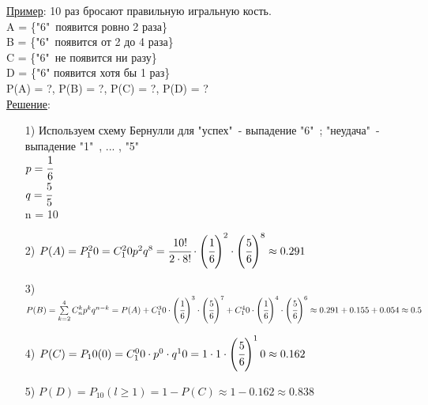 \underline{Пример}: 10 раз бросают правильную игральную кость. \\
A = \{"6"\ появится ровно 2 раза\} \\
B = \{"6"\ появится от 2 до 4 раза\} \\
C = \{"6"\ не появится ни разу\} \\
D = \{"6" появится хотя бы 1 раз\} \\
P(A) = ?, P(B) = ?, P(C) = ?, P(D) = ? \\
\underline{Решение}: \\
\begin{enumerate}
\item[1)] Используем схему Бернулли для "успех"\ - выпадение "6"\ ; "неудача"\ - выпадение "1"\ , ... , "5"\ \\
$p = \cfrac{1}{6}$ \\
$q = \cfrac{5}{5}$ \\
n = 10 \\

\item[2)] $P(A) = P^2_10 = C^2_10 p^2 q^8 = \cfrac{10!}{2 \cdot 8!} \cdot \left(\cfrac{1}{6}\right)^2 \cdot\left(\cfrac{5}{6}\right)^8 \approx 0.291$ \\

\item[3)] $P(B) = \sum\limits_{k = 2}^{4} C^k_n p^k q^{n - k} = P(A) + C^3_10\cdot \left(\cfrac{1}{6}\right)^3 \cdot \left(\cfrac{5}{6}\right)^7 + C^4_10 \cdot \left(\cfrac{1}{6}\right)^4 \cdot \left(\cfrac{5}{6}\right)^6 \approx 0.291 + 0.155 + 0.054 \approx 0.5$ \\

\item[4)] $P(C) = P_10(0) = C^0_10 \cdot p^0 \cdot q^10 = 1 \cdot 1 \cdot \left(\cfrac{5}{6}\right)^10 \approx 0.162$ \\

\item[5)] $P(D) = P_10 (l \geqslant 1) = 1 - P(C) \approx 1 - 0.162 \approx 0.838$ \\
\end{enumerate}



